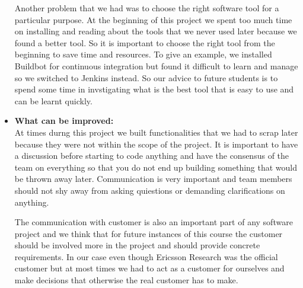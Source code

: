\begin{itemize}
Another problem that we had was to choose the right software tool for a particular purpose. At the beginning of this project we spent too much time on installing and reading about the tools that we never used later because we found a better tool. So it is important to choose the right tool from the beginning to save time and resources. To give an example, we installed Buildbot for continuous integration but found it difficult to learn and manage so we switched to Jenkins instead. So our advice to future students is to spend some time in invstigating what is the best tool that is easy to use and can be learnt quickly.          

\item{\textbf{What can be improved:}}\\
 At times durng this project we built functionalities that we had to scrap later because they were not within the scope of the project. It is important to have a discussion before starting to code anything and have the consensus of the team on everything so that you do not end up building something that would be thrown away later. Communication is very important and team members should not shy away from asking quiestions or demanding clarifications on anything.  
 
The communication with customer is also an important part of any software project and we think that for future instances of this course the customer should be involved more in the project and should provide concrete requirements. In our case even though Ericsson Research was the official customer but at most times we had to act as a customer for ourselves and make decisions that otherwise the real customer has to make. 
\end{itemize}
